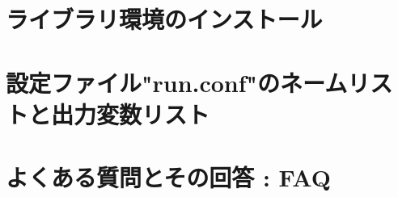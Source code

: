 \documentclass[a4paper]{jreport}
\begin{document}



\begin{appendix}
\chapter{ライブラリ環境のインストール} \label{achap:env_setting}

\chapter{設定ファイル"run.conf"のネームリストと出力変数リスト} \label{achap:namelist}

\chapter{よくある質問とその回答 : FAQ} \label{achap:practice}


\end{appendix}

\ClearWallPaper

\end{document}
